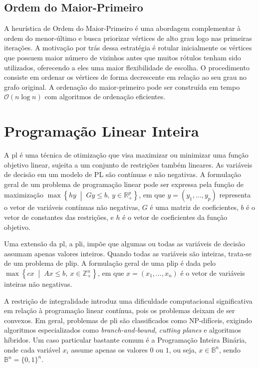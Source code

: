 \subsection{Ordem do Maior-Primeiro}

A heurística de Ordem do Maior-Primeiro é uma abordagem complementar à ordem do menor-último e busca priorizar vértices de alto grau logo nas primeiras iterações. A motivação por trás dessa estratégia é rotular inicialmente os vértices que possuem maior número de vizinhos antes que muitos rótulos tenham sido utilizados, oferecendo a eles uma maior flexibilidade de escolha. O procedimento consiste em ordenar os vértices de forma decrescente em relação ao seu grau no grafo original. A ordenação do maior-primeiro pode ser construída em tempo \( \mathcal{O}(n \log n) \) com algoritmos de ordenação eficientes. 



\section{Programação Linear Inteira}

A \gls{pl} é uma técnica de otimização que visa maximizar ou minimizar uma função objetivo linear, sujeita a um conjunto de restrições também lineares. As variáveis de decisão em um modelo de PL são contínuas e não negativas. A formulação geral de um problema de programação linear pode ser expressa pela função de maximização $\max \left\{ hy \;\middle|\; Gy \leq b,\ y \in \mathbb{R}_+^p \right\}$, em que \(y = (y_1, \ldots, y_p)\) representa o vetor de variáveis contínuas não negativas, \(G\) é uma matriz de coeficientes, \(b\) é o vetor de constantes das restrições, e \(h\) é o vetor de coeficientes da função objetivo.

Uma extensão da \gls{pl}, a \gls{pli}, impõe que algumas ou todas as variáveis de decisão assumam apenas valores inteiros. Quando todas as variáveis são inteiras, trata-se de um problema de \gls{plip}. A formulação geral de uma \gls{plip} é dada pelo $\max \left\{ cx \;\middle|\; Ax \leq b,\ x \in \mathbb{Z}_+^n \right\}$, em que \(x = (x_1, \ldots, x_n)\) é o vetor de variáveis inteiras não negativas.

A restrição de integralidade introduz uma dificuldade computacional significativa em relação à programação linear contínua, pois os problemas deixam de ser convexos. Em geral, problemas de \gls{pli} são classificados como NP-difíceis, exigindo algoritmos especializados como \emph{branch-and-bound}, \emph{cutting planes} e algoritmos híbridos. Um caso particular bastante comum é a Programação Inteira Binária, onde cada variável \(x_i\) assume apenas os valores \(0\) ou \(1\), ou seja, \(x \in \mathbb{B}^n\), sendo \(\mathbb{B}^n = \{0,1\}^n\).

